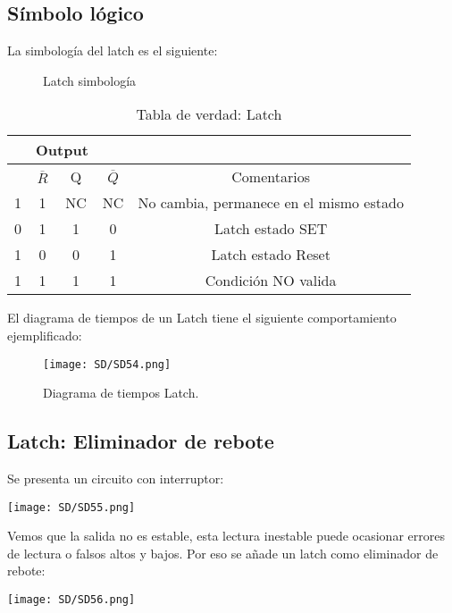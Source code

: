 \documentclass[
	11pt, %
	fleqn, %
	a4paper, %
]{LegrandOrangeBook}
\begin{document}
\subsection{Símbolo lógico}
La simbología del latch es el siguiente:
\begin{figure}
    \centering
    \qquad
    \caption{Latch simbología}
\end{figure}
\begin{table}[h]
\begin{center}
\begin{tabular}{|cc|cc|c|}
\hline
\rowcolor{ocre!70}
\multicolumn{2}{|c|}{Input}                           & \multicolumn{2}{c|}{Output}              &                                         \\ \hline
\rowcolor{ocre!50}
\multicolumn{1}{|c|}{$\overline{S}$} & $\overline{R}$ & \multicolumn{1}{c|}{Q}  & $\overline{Q}$ & Comentarios                             \\ \hline
\multicolumn{1}{|c|}{1}              & 1              & \multicolumn{1}{c|}{NC} & NC             & No cambia, permanece en el mismo estado \\ \hline
\multicolumn{1}{|c|}{0}              & 1              & \multicolumn{1}{c|}{1}  & 0              & Latch estado SET                        \\ \hline
\multicolumn{1}{|c|}{1}              & 0              & \multicolumn{1}{c|}{0}  & 1              & Latch estado Reset                      \\ \hline
\multicolumn{1}{|c|}{1}              & 1              & \multicolumn{1}{c|}{1}  & 1              & Condición NO valida                     \\ \hline
\end{tabular}
\caption{Tabla de verdad: Latch}
\end{center}
\end{table}
El diagrama de tiempos de un Latch tiene el siguiente comportamiento ejemplificado:
\begin{figure}[H]
\centering
\texttt{[image: SD/SD54.png]}
\caption{Diagrama de tiempos Latch.}
\end{figure}
\subsection{Latch: Eliminador de rebote}
Se presenta un circuito con interruptor:\\
\begin{center}
\texttt{[image: SD/SD55.png]}
\end{center}
Vemos que la salida no es estable, esta lectura inestable puede ocasionar errores de lectura o falsos altos y bajos. Por eso se añade un latch como eliminador de rebote:\\
\begin{center}
\texttt{[image: SD/SD56.png]}
\end{center}
\end{document}
